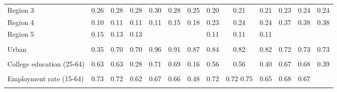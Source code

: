 \begin{tabular}{l*{12}{c}}
Region 3 & 0.26 & 0.28 & 0.28 & 0.30 & 0.28 & 0.25 & 0.20 & 0.21 & 0.21 & 0.23 & 0.24 & 0.24 \\
Region 4 & 0.10 & 0.11 & 0.11 & 0.11 & 0.15 & 0.18 & 0.23 & 0.24 & 0.24 & 0.37 & 0.38 & 0.38 \\
Region 5 & 0.15 & 0.13 & 0.13 & & & & 0.11 & 0.11 & 0.11 & & & \\
\\
Urban & 0.35 & 0.70 & 0.70 & 0.96 & 0.91 & 0.87 & 0.84 & 0.82 & 0.82 & 0.72 & 0.73 & 0.73 \\
\\
College education (25-64) & 0.63 & 0.63 & 0.28 & 0.71 & 0.69 & 0.16 & 0.56 & 0.56 & 0.40 & 0.67 & 0.68 & 0.39 \\
\\
Employment rate (15-64) & 0.73 & 0.72 & 0.62 & 0.67 & 0.66 & 0.48 & 0.72 & 0.72 0.75 & 0.65 & 0.68 & 0.67 \\
\\
\bottomrule
\end{tabular}